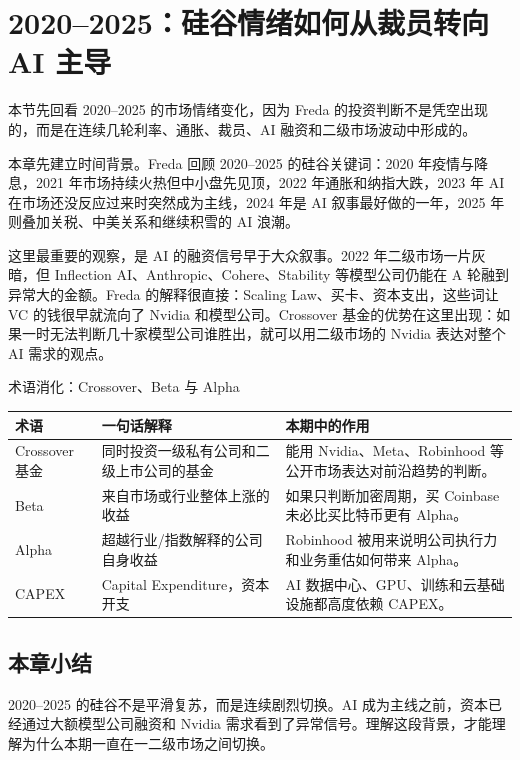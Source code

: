 \section{2020--2025：硅谷情绪如何从裁员转向 AI 主导}

本节先回看 2020--2025 的市场情绪变化，因为 Freda 的投资判断不是凭空出现的，而是在连续几轮利率、通胀、裁员、AI 融资和二级市场波动中形成的。

本章先建立时间背景。Freda 回顾 2020--2025 的硅谷关键词：2020 年疫情与降息，2021 年市场持续火热但中小盘先见顶，2022 年通胀和纳指大跌，2023 年 AI 在市场还没反应过来时突然成为主线，2024 年是 AI 叙事最好做的一年，2025 年则叠加关税、中美关系和继续积雪的 AI 浪潮。

这里最重要的观察，是 AI 的融资信号早于大众叙事。2022 年二级市场一片灰暗，但 Inflection AI、Anthropic、Cohere、Stability 等模型公司仍能在 A 轮融到异常大的金额。Freda 的解释很直接：Scaling Law、买卡、资本支出，这些词让 VC 的钱很早就流向了 Nvidia 和模型公司。Crossover 基金的优势在这里出现：如果一时无法判断几十家模型公司谁胜出，就可以用二级市场的 Nvidia 表达对整个 AI 需求的观点。

\begin{knowledgebox}{术语消化：Crossover、Beta 与 Alpha}
\begin{tabularx}{\textwidth}{p{}p{}X}
\toprule
术语 & 一句话解释 & 本期中的作用 \\
\midrule
Crossover 基金 & 同时投资一级私有公司和二级上市公司的基金 & 能用 Nvidia、Meta、Robinhood 等公开市场表达对前沿趋势的判断。 \\
Beta & 来自市场或行业整体上涨的收益 & 如果只判断加密周期，买 Coinbase 未必比买比特币更有 Alpha。 \\
Alpha & 超越行业/指数解释的公司自身收益 & Robinhood 被用来说明公司执行力和业务重估如何带来 Alpha。 \\
CAPEX & Capital Expenditure，资本开支 & AI 数据中心、GPU、训练和云基础设施都高度依赖 CAPEX。 \\
\bottomrule
\end{tabularx}
\end{knowledgebox}

\subsection{本章小结}

2020--2025 的硅谷不是平滑复苏，而是连续剧烈切换。AI 成为主线之前，资本已经通过大额模型公司融资和 Nvidia 需求看到了异常信号。理解这段背景，才能理解为什么本期一直在一二级市场之间切换。

